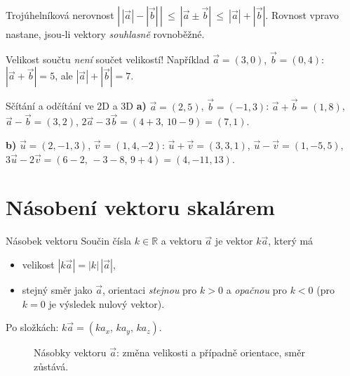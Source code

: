 \documentclass[a4paper,11pt]{article}
\newcommand{\R}{\mathbb{R}}
\newcommand{\abs}[1]{\left\lvert #1\right\rvert}
\begin{document}
\begin{veta}{Trojúhelníková nerovnost}
$\abs{\,\abs{\vec a}-\abs{\vec b}\,}\ \le\ \abs{\vec a\pm\vec b}\ \le\ \abs{\vec a}+\abs{\vec b}.$
Rovnost vpravo nastane, jsou-li vektory \emph{souhlasně} rovnoběžné.
\end{veta}

\begin{pozor}
Velikost součtu \emph{není} součet velikostí! Například $\vec a=(3,0)$,
$\vec b=(0,4)$: $\abs{\vec a+\vec b}=5$, ale $\abs{\vec a}+\abs{\vec b}=7$.
\end{pozor}

\begin{priklad}{Sčítání a odčítání ve 2D a 3D}
\textbf{a)} $\vec a=(2,5)$, $\vec b=(-1,3)$:\quad
$\vec a+\vec b=(1,8)$, \quad $\vec a-\vec b=(3,2)$, \quad
$2\vec a-3\vec b=(4+3,\,10-9)=(7,1)$.

\smallskip\noindent
\textbf{b)} $\vec u=(2,-1,3)$, $\vec v=(1,4,-2)$:\quad
$\vec u+\vec v=(3,3,1)$, \quad $\vec u-\vec v=(1,-5,5)$,\quad
$3\vec u-2\vec v=(6-2,\,-3-8,\,9+4)=(4,-11,13)$.
\end{priklad}

\section{Násobení vektoru skalárem}

\begin{definice}{Násobek vektoru}
Součin čísla $k\in\R$ a vektoru $\vec a$ je vektor $k\vec a$, který má
\begin{itemize}
  \item velikost $\abs{k\vec a}=\abs{k}\,\abs{\vec a}$,
  \item stejný směr jako $\vec a$, orientaci \emph{stejnou} pro $k>0$ a \emph{opačnou}
        pro $k<0$ (pro $k=0$ je výsledek nulový vektor).
\end{itemize}
Po složkách: $k\vec a=(ka_x,\,ka_y,\,ka_z)$.
\end{definice}

\begin{figure}[!htbp]
\centering
{}
\caption{Násobky vektoru $\vec a$: změna velikosti a případně orientace, směr zůstává.}
\end{figure}
\end{document}
